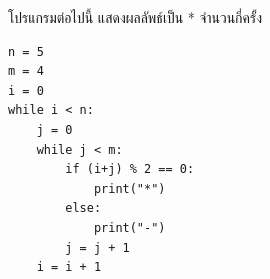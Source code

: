 \question โปรแกรมต่อไปนี้ แสดงผลลัพธ์เป็น * จำนวนกี่ครั้ง
\begin{verbatim}
n = 5
m = 4
i = 0
while i < n:
    j = 0
    while j < m:
        if (i+j) % 2 == 0:
            print("*")
        else:
            print("-")
        j = j + 1
    i = i + 1
\end{verbatim}

